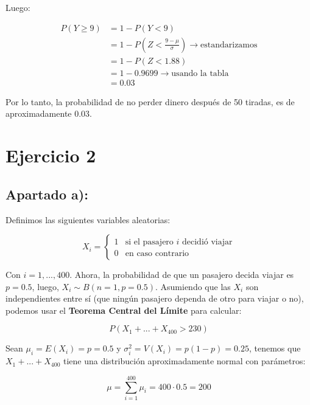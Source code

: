 \documentclass[11pt]{article}
\begin{document}
Luego:

\begin{align*}
    P(Y \geq 9) & = 1 - P(Y < 9) \\
                & = 1 - P(Z < \frac{ 9 -\mu}{\sigma}) \rightarrow \text{estandarizamos} \\
                & = 1 - P(Z < 1.88)  \\
                & = 1 - 0.9699 \rightarrow \text{usando la tabla} \\
                & = 0.03
\end{align*}

Por lo tanto, la probabilidad de no perder dinero después de 50 tiradas, es de
aproximadamente 0.03.


\newpage

\section*{Ejercicio 2}

\subsection*{Apartado a):}

Definimos las siguientes variables aleatorias:

\[
    X_i = \begin{cases}
            1 & \text{si el pasajero $i$ decidió viajar} \\
            0 & \text{en caso contrario}
          \end{cases}
\]

Con $i = 1,..., 400$. Ahora, la probabilidad de que un pasajero decida
viajar es $p = 0.5$, luego, $X_i \sim B(n = 1, p = 0.5)$. Asumiendo que las
$X_i$ son independientes entre sí (que ningún pasajero dependa de otro para viajar o no), 
podemos usar el \textbf{Teorema Central del Límite} para calcular:

\begin{equation*}
    P(X_1 + ... + X_{400} > 230)
\end{equation*}

Sean $\mu_i = E(X_i) = p = 0.5$ y $\sigma_i^2 = V(X_i) = p(1 - p) = 0.25$, 
tenemos que $X_1 + ... + X_{400}$ tiene una distribución aproximadamente normal
con parámetros:

\begin{equation*}
    \mu = \displaystyle\sum_{i=1}^{400} \mu_i = 400 \cdot 0.5 = 200
\end{equation*}
\end{document}
